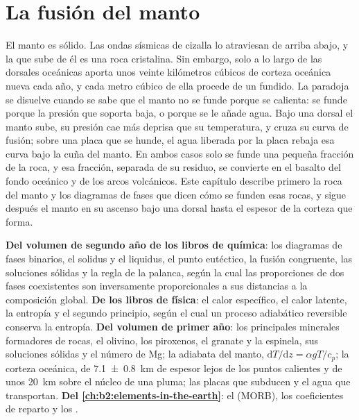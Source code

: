 \chapter{La fusión del manto}\label{ch:b2:mantle-melting}

El manto es sólido. Las ondas sísmicas de cizalla lo atraviesan de arriba abajo, y la
 que sube de él es una roca cristalina. Sin embargo, solo a lo largo de las dorsales
oceánicas aporta unos veinte kilómetros cúbicos de corteza oceánica nueva cada año,
y cada metro cúbico de ella procede de un fundido. La paradoja se disuelve cuando se sabe
que el manto no se funde porque se calienta: se funde porque la
presión que soporta baja, o porque se le añade agua. Bajo una dorsal el
manto sube, su presión cae más deprisa que su temperatura, y cruza su
curva de fusión; sobre una placa que se hunde, el agua liberada por la placa rebaja esa
curva bajo la cuña del manto. En ambos casos solo se funde una pequeña fracción de la roca,
y esa fracción, separada de su residuo, se convierte en el basalto del
fondo oceánico y de los arcos volcánicos. Este capítulo describe primero la roca del
manto y los diagramas de fases que dicen cómo se funden esas rocas, y sigue después el
manto en su ascenso bajo una dorsal hasta el espesor de la corteza que forma.

\begin{recall}
\textbf{Del volumen de segundo año de los libros de química}: los diagramas de fases binarios, el
solidus y el liquidus, el punto eutéctico, la fusión congruente, las soluciones sólidas
y la regla de la palanca, según la cual las proporciones de dos fases coexistentes son
inversamente proporcionales a sus distancias a la composición global.
\textbf{De los libros de física}: el calor específico, el calor latente, la entropía
y el segundo principio, según el cual un proceso adiabático reversible conserva la entropía.
\textbf{Del volumen de primer año}: los principales minerales formadores de rocas, el olivino,
los piroxenos, el granate y la espinela, sus soluciones sólidas y el número de Mg; la
adiabata del manto, $\mathrm dT/\mathrm dz = \alpha gT/c_p$; la corteza oceánica, de
\qty[uncertainty-mode=separate]{7.1 \pm 0.8}{km} de espesor lejos de los puntos calientes y de
unos \qty{20}{km} sobre el núcleo de una pluma; las placas que subducen y el agua que
transportan. \textbf{Del \cref{ch:b2:elements-in-the-earth}}: el 
(MORB), los coeficientes de reparto y los .
\end{recall}

